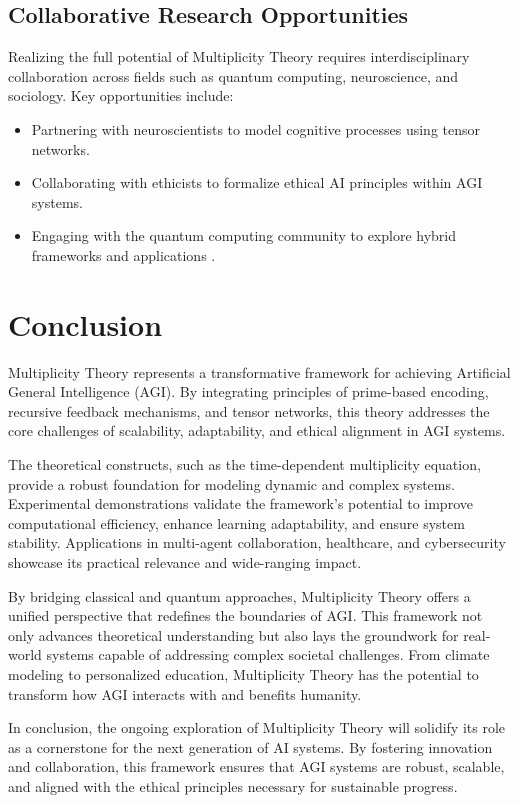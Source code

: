 \documentclass{article}
\theoremstyle{plain}
\begin{document}
\subsection{Collaborative Research Opportunities}
Realizing the full potential of Multiplicity Theory requires interdisciplinary collaboration across fields such as quantum computing, neuroscience, and sociology. Key opportunities include:
\begin{itemize}
    \item Partnering with neuroscientists to model cognitive processes using tensor networks.
    \item Collaborating with ethicists to formalize ethical AI principles within AGI systems.
    \item Engaging with the quantum computing community to explore hybrid frameworks and applications \cite{preskill2018quantum, biamonte2017tensor}.
\end{itemize}
\section{Conclusion}

Multiplicity Theory represents a transformative framework for achieving Artificial General Intelligence (AGI). By integrating principles of prime-based encoding, recursive feedback mechanisms, and tensor networks, this theory addresses the core challenges of scalability, adaptability, and ethical alignment in AGI systems.

The theoretical constructs, such as the time-dependent multiplicity equation, provide a robust foundation for modeling dynamic and complex systems. Experimental demonstrations validate the framework’s potential to improve computational efficiency, enhance learning adaptability, and ensure system stability. Applications in multi-agent collaboration, healthcare, and cybersecurity showcase its practical relevance and wide-ranging impact.

By bridging classical and quantum approaches, Multiplicity Theory offers a unified perspective that redefines the boundaries of AGI. This framework not only advances theoretical understanding but also lays the groundwork for real-world systems capable of addressing complex societal challenges. From climate modeling to personalized education, Multiplicity Theory has the potential to transform how AGI interacts with and benefits humanity.

In conclusion, the ongoing exploration of Multiplicity Theory will solidify its role as a cornerstone for the next generation of AI systems. By fostering innovation and collaboration, this framework ensures that AGI systems are robust, scalable, and aligned with the ethical principles necessary for sustainable progress.




\end{document}
